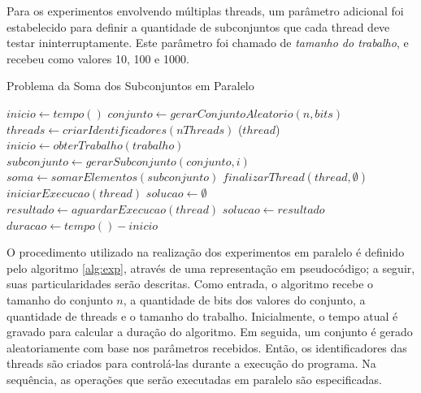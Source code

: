 \documentclass[12pt]{article}
\begin{document}
Para os experimentos envolvendo múltiplas threads, um parâmetro adicional foi estabelecido para definir a quantidade de subconjuntos que cada thread deve testar ininterruptamente. Este parâmetro foi chamado de \textit{tamanho do trabalho}, e recebeu como valores 10, 100 e 1000.

\begin{algorithm}[ht]
  \small
  \DontPrintSemicolon
  \caption{Problema da Soma dos Subconjuntos em Paralelo}
  \label{alg:exp}

  \BlankLine
  $inicio \leftarrow tempo()$ \;
  $conjunto \leftarrow gerarConjuntoAleatorio(n, bits)$ \;
  $threads \leftarrow criarIdentificadores(nThreads)$ \;
  \BlankLine
   {
    \Parallel($thread$){
         {
            $inicio \leftarrow obterTrabalho(trabalho)$ \;
             {
                $subconjunto \leftarrow gerarSubconjunto(conjunto, i)$ \;
                $soma \leftarrow somarElementos(subconjunto)$ \;
                \BlankLine
            }
        }
        \BlankLine
        $finalizarThread(thread, \emptyset)$ \;
    }
    \BlankLine
    $iniciarExecucao(thread)$ \;
  }
  \BlankLine
  $solucao \leftarrow \emptyset$ \;
  \BlankLine
   {
    $resultado \leftarrow aguardarExecucao(thread)$ \;
     {
      $solucao \leftarrow resultado$ \;
    }
  }
  \BlankLine
  $duracao \leftarrow tempo() - inicio$ \;
   \;
\end{algorithm}

O procedimento utilizado na realização dos experimentos em paralelo é definido pelo algoritmo \ref{alg:exp}, através de uma representação em pseudocódigo; a seguir, suas particularidades serão descritas. Como entrada, o algoritmo recebe o tamanho do conjunto $n$, a quantidade de bits dos valores do conjunto, a quantidade de threads e o tamanho do trabalho. Inicialmente, o tempo atual é gravado para calcular a duração do algoritmo. Em seguida, um conjunto é gerado aleatoriamente com base nos parâmetros recebidos. Então, os identificadores das threads são criados para controlá-las durante a execução do programa. Na sequência, as operações que serão executadas em paralelo são especificadas.
\end{document}
